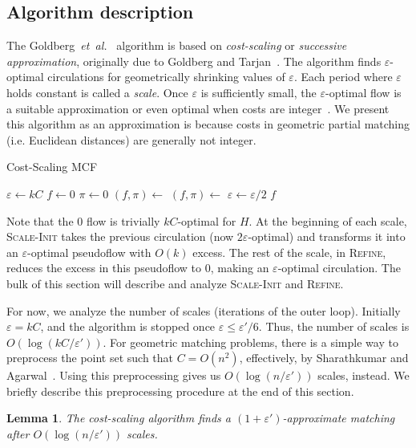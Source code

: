\documentclass[11pt]{article}
\def\etal{\textsl{et~al.}}
\def\eps{\varepsilon}
\theoremstyle{plain}
\newtheorem{lemma}{Lemma}
\begin{document}
\subsection{Algorithm description}

The Goldberg~{\etal}~\cite{GHKT17} algorithm is based on \emph{cost-scaling} or
\emph{successive approximation}, originally due to Goldberg and
Tarjan~\cite{GT90}.
The algorithm finds $\eps$-optimal circulations for geometrically shrinking
values of $\eps$.
Each period where $\eps$ holds constant is called a \emph{scale}.
Once $\eps$ is sufficiently small, the $\eps$-optimal flow is a suitable
approximation or even optimal when costs are integer~\cite{GT90,GHKT17}.
We present this algorithm as an approximation is because costs in geometric
partial matching (i.e. Euclidean distances) are generally not integer.

\begin{algorithm}
\caption{Cost-Scaling MCF}
\begin{algorithmic}[1]
\Function{MCF}{$H$, $\eps'$}
	\State $\eps \gets kC$
	\State $f \gets 0$
	\State $\pi \gets 0$
	\Repeat
		\State $(f, \pi) \gets$ 
		\State $(f, \pi) \gets$ 
		\State $\eps \gets \eps/2$
	\Until{$\eps \leq \eps'/6$}
	\State\Return $f$
\EndFunction
\end{algorithmic}
\end{algorithm}

Note that the 0 flow is trivially $kC$-optimal for $H$.
At the beginning of each scale, \textsc{Scale-Init} takes the previous
circulation (now $2\eps$-optimal) and transforms it into an $\eps$-optimal
pseudoflow with $O(k)$ excess.
The rest of the scale, in \textsc{Refine}, reduces the excess in this
pseudoflow to 0, making an $\eps$-optimal circulation.
The bulk of this section will describe and analyze \textsc{Scale-Init} and
\textsc{Refine}.

For now, we analyze the number of scales (iterations of the outer loop).
Initially $\eps = kC$, and the algorithm is stopped once $\eps \leq \eps'/6$.
Thus, the number of scales is $O(\log(kC/\eps'))$.
For geometric matching problems, there is a simple way to preprocess the point 
set such that $C = O(n^2)$, effectively, by Sharathkumar and Agarwal~\cite{SA12}.
Using this preprocessing gives us $O(\log(n/\eps'))$ scales, instead.
We briefly describe this preprocessing procedure at the end of this section.

\begin{lemma}
\label{lemma:goldberg_scales}
The cost-scaling algorithm finds a $(1 + \eps')$-approximate matching after
$O(\log(n/\eps'))$ scales.
\end{lemma}
\end{document}
